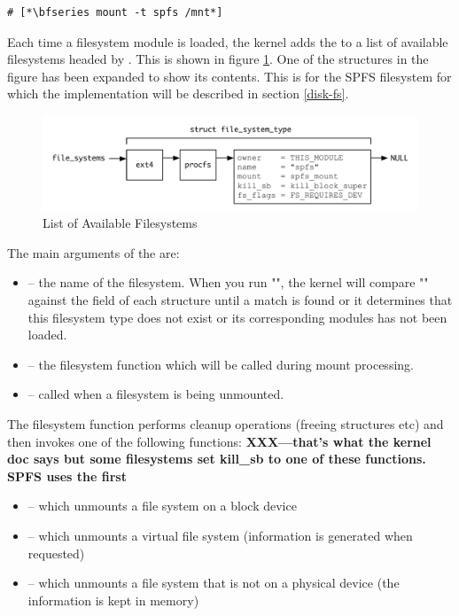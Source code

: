 \begin{lstlisting}
# [*\bfseries mount -t spfs /mnt*]
\end{lstlisting}

\noindent
Each time a filesystem module is loaded, the kernel adds the  to a list of available filesystems headed by . This is shown in figure \ref{fig:filesystems-available-expanded}. One of the structures in the figure has been expanded to show its contents. This is for the SPFS filesystem for which the implementation will be described in section \ref{disk-fs}. 

\begin{figure}
	\includegraphics[scale=0.6]{figures/filesystems-available-expanded.pdf}
	\centering
	\caption{List of Available Filesystems}
	\label{fig:filesystems-available-expanded}
\end{figure}

\noindent
The main arguments of the  are:

\begin{itemize}
	\item {} -- the name of the filesystem. When you run "", the kernel will
		compare "" against the  field of each structure until a match is found or it 
		determines that this filesystem type does not exist or its corresponding modules has not
		been loaded.
	\item {} -- the filesystem function which will be called during mount processing.
	\item {} -- called when a filesystem is being unmounted.
\end{itemize}

\noindent
The filesystem  function performs cleanup operations (freeing structures etc) and then invokes one of the following functions: \textbf{XXX---that's what the kernel doc says but some filesystems set kill\_sb to one of these functions. SPFS uses the first}

\begin{itemize}
	\item {} -- which unmounts a file system on a block device
	\item {} -- which unmounts a virtual file system (information is generated when requested)
	\item {} -- which unmounts a file system that is not on a physical device (the information 
			is kept in memory)
\end{itemize}

